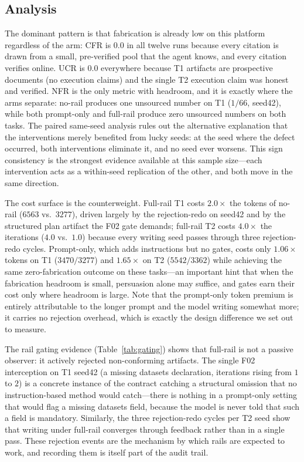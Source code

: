 \documentclass[10pt,twocolumn]{article}
\begin{document}
\subsection{Analysis}
The dominant pattern is that fabrication is already low on this platform regardless of the arm: CFR is $0.0$ in all twelve runs because every citation is drawn from a small, pre-verified pool that the agent knows, and every citation verifies online. UCR is $0.0$ everywhere because T1 artifacts are prospective documents (no execution claims) and the single T2 execution claim was honest and verified. NFR is the only metric with headroom, and it is exactly where the arms separate: no-rail produces one unsourced number on T1 ($1/66$, seed42), while both prompt-only and full-rail produce zero unsourced numbers on both tasks. The paired same-seed analysis rules out the alternative explanation that the interventions merely benefited from lucky seeds: at the seed where the defect occurred, both interventions eliminate it, and no seed ever worsens. This sign consistency is the strongest evidence available at this sample size---each intervention acts as a within-seed replication of the other, and both move in the same direction.

The cost surface is the counterweight. Full-rail T1 costs $2.0\times$ the tokens of no-rail ($6563$ vs.\ $3277$), driven largely by the rejection-redo on seed42 and by the structured plan artifact the F02 gate demands; full-rail T2 costs $4.0\times$ the iterations ($4.0$ vs.\ $1.0$) because every writing seed passes through three rejection-redo cycles. Prompt-only, which adds instructions but no gates, costs only $1.06\times$ tokens on T1 ($3470/3277$) and $1.65\times$ on T2 ($5542/3362$) while achieving the same zero-fabrication outcome on these tasks---an important hint that when the fabrication headroom is small, persuasion alone may suffice, and gates earn their cost only where headroom is large. Note that the prompt-only token premium is entirely attributable to the longer prompt and the model writing somewhat more; it carries no rejection overhead, which is exactly the design difference we set out to measure.

The rail gating evidence (Table~\ref{tab:gating}) shows that full-rail is not a passive observer: it actively rejected non-conforming artifacts. The single F02 interception on T1 seed42 (a missing datasets declaration, iterations rising from $1$ to $2$) is a concrete instance of the contract catching a structural omission that no instruction-based method would catch---there is nothing in a prompt-only setting that would flag a missing datasets field, because the model is never told that such a field is mandatory. Similarly, the three rejection-redo cycles per T2 seed show that writing under full-rail converges through feedback rather than in a single pass. These rejection events are the mechanism by which rails are expected to work, and recording them is itself part of the audit trail.
\end{document}
